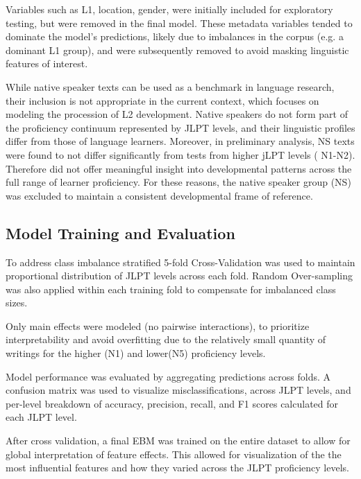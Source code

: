 Variables such as L1, location, gender, were initially included for
exploratory
testing, but were removed in the final model. These metadata variables  tended to dominate the model's
predictions, likely due to imbalances in the corpus (e.g. a dominant L1 group), and were subsequently removed to avoid
masking linguistic features of interest.

While native speaker texts can be used as a benchmark in language research, their inclusion is not appropriate in
the current context, which focuses on modeling the procession of L2 development. Native speakers do not form part of
the proficiency continuum represented by JLPT levels, and their linguistic profiles differ from those
of language learners. Moreover, in preliminary analysis, NS texts were found to not differ significantly from
tests from higher jLPT levels (
N1-N2).  Therefore did
not offer meaningful insight into developmental patterns across the full range of learner proficiency. For these
reasons, the native speaker group (NS) was excluded to maintain a consistent developmental frame of reference.

\subsection{Model Training and Evaluation}

To address class imbalance stratified 5-fold Cross-Validation was used to maintain proportional distribution of JLPT
levels across each fold. Random Over-sampling was also applied within each training fold to compensate for
imbalanced class sizes.

Only main effects were modeled (no pairwise interactions), to prioritize interpretability and avoid overfitting
due to the relatively small quantity of writings for the higher (N1) and lower(N5) proficiency levels.

Model performance was evaluated by aggregating predictions across folds. A confusion
matrix was used to visualize misclassifications,
across JLPT levels, and per-level breakdown of accuracy, precision, recall, and F1 scores calculated for each JLPT
level.

After cross validation, a final EBM was trained on the entire dataset to allow for global interpretation of feature
effects. This allowed for visualization of the
the most influential features and how they varied across
the JLPT proficiency levels.




